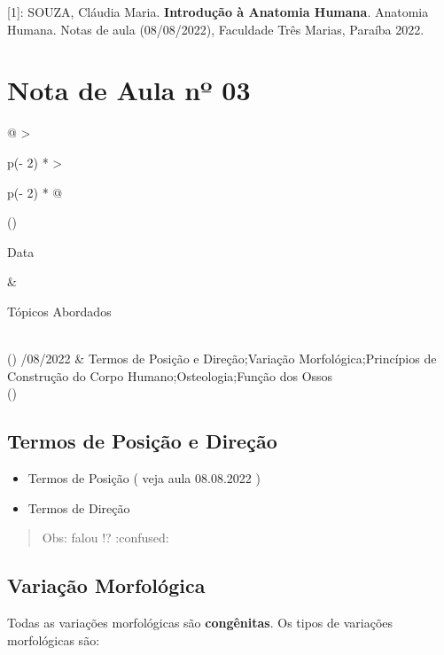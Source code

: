 \documentclass[
]{book}
\providecommand{\tightlist}{%
  \setlength{\itemsep}{0pt}\setlength{\parskip}{0pt}}
\begin{document}
{[}1{]}: SOUZA, Cláudia Maria. \textbf{Introdução à Anatomia Humana}. Anatomia Humana. Notas de aula (08/08/2022), Faculdade Três Marias, Paraíba 2022.

\hypertarget{nota-de-aula-nuxba-03}{%
\section{Nota de Aula nº 03}\label{nota-de-aula-nuxba-03}}

\begin{longtable}[]{@{}
  >{\raggedright\arraybackslash}p{(\columnwidth - 2\tabcolsep) * }
  >{\raggedright\arraybackslash}p{(\columnwidth - 2\tabcolsep) * }@{}}
\toprule()
\begin{minipage}[b]{\linewidth}\raggedright
Data
\end{minipage} & \begin{minipage}[b]{\linewidth}\raggedright
Tópicos Abordados
\end{minipage} \\
\midrule()
/08/2022 & Termos de Posição e Direção;Variação Morfológica;Princípios de Construção do Corpo Humano;Osteologia;Função dos Ossos \\
\bottomrule()
\end{longtable}

\hypertarget{termos-de-posiuxe7uxe3o-e-direuxe7uxe3o-1}{%
\subsection{Termos de Posição e Direção}\label{termos-de-posiuxe7uxe3o-e-direuxe7uxe3o-1}}

\begin{itemize}
\tightlist
\item
  Termos de Posição ( veja aula 08.08.2022 )
\item
  Termos de Direção
\end{itemize}

\begin{quote}
Obs: falou !? :confused:
\end{quote}

\hypertarget{variauxe7uxe3o-morfoluxf3gica}{%
\subsection{Variação Morfológica}\label{variauxe7uxe3o-morfoluxf3gica}}

Todas as variações morfológicas são \textbf{congênitas}. Os tipos de variações morfológicas são:
\end{document}
